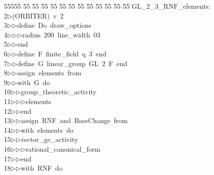 %
%
\begin{tabbing}
55555 \= 55 \= 55 \= 55 \= 55 \= 55 \= 55 \= 55 \= 55 \= 55 \= 55 \= 55 \= 55 \= \>GL\_2\_3\_RNF\_elements:\\[0pt]
2\>$\triangleright$\>(ORBITER)\ v\ 2\ \\[0pt]
3\>$\triangleright$\>$\triangleright$\>define\ Do\ draw\_options\ \\[0pt]
4\>$\triangleright$\>$\triangleright$\>$\triangleright$\>radius\ 200\ line\_width\ 03\ \\[0pt]
5\>$\triangleright$\>$\triangleright$\>end\ \\[0pt]
6\>$\triangleright$\>$\triangleright$\>define\ F\ finite\_field\ q\ 3\ end\ \\[0pt]
7\>$\triangleright$\>$\triangleright$\>define\ G\ linear\_group\ GL\ 2\ F\ end\ \\[0pt]
8\>$\triangleright$\>$\triangleright$\>assign\ elements\ from\ \\[0pt]
9\>$\triangleright$\>$\triangleright$\>with\ G\ do\ \\[0pt]
10\>$\triangleright$\>$\triangleright$\>group\_theoretic\_activity\ \\[0pt]
11\>$\triangleright$\>$\triangleright$\>$\triangleright$\>elements\ \\[0pt]
12\>$\triangleright$\>$\triangleright$\>end\ \\[0pt]
13\>$\triangleright$\>$\triangleright$\>assign\ RNF\ and\ BaseChange\ from\ \\[0pt]
14\>$\triangleright$\>$\triangleright$\>with\ elements\ do\ \\[0pt]
15\>$\triangleright$\>$\triangleright$\>vector\_ge\_activity\ \\[0pt]
16\>$\triangleright$\>$\triangleright$\>$\triangleright$\>rational\_canonical\_form\ \\[0pt]
17\>$\triangleright$\>$\triangleright$\>end\ \\[0pt]
18\>$\triangleright$\>$\triangleright$\>with\ RNF\ do\ \\[0pt]

\end{tabbing}

